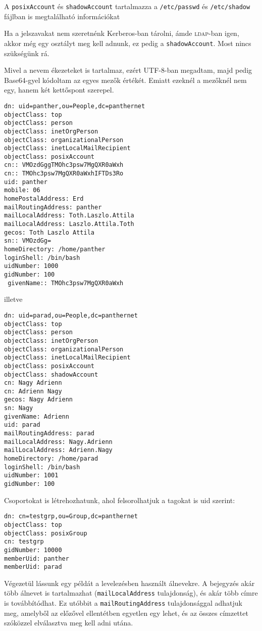 A \texttt{posixAccount} és \texttt{shadowAccount} tartalmazza a \texttt{/etc/passwd} és \texttt{/etc/shadow} fájlban
is megtalálható információkat

Ha a jelszavakat nem szeretnénk Kerberos-ban tárolni, ámde \textsc{ldap}-ban igen, akkor még egy osztályt meg kell adnunk, ez
pedig a \texttt{shadowAccount}. Most nincs szükségünk rá.

Mivel a nevem ékezeteket is tartalmaz, ezért UTF-8-ban megadtam, majd pedig Base64-gyel kódoltam az egyes mezők
értékét. Emiatt ezeknél a mezőknél nem egy, hanem két kettőspont szerepel.

\begin{Verbatim}[frame=single]
dn: uid=panther,ou=People,dc=panthernet
objectClass: top
objectClass: person
objectClass: inetOrgPerson
objectClass: organizationalPerson
objectClass: inetLocalMailRecipient
objectClass: posixAccount
cn:: VMOzdGggTMOhc3psw7MgQXR0aWxh
cn:: TMOhc3psw7MgQXR0aWxhIFTDs3Ro
uid: panther
mobile: 06
homePostalAddress: Erd
mailRoutingAddress: panther
mailLocalAddress: Toth.Laszlo.Attila
mailLocalAddress: Laszlo.Attila.Toth
gecos: Toth Laszlo Attila
sn:: VMOzdGg=
homeDirectory: /home/panther
loginShell: /bin/bash
uidNumber: 1000
gidNumber: 100
 givenName:: TMOhc3psw7MgQXR0aWxh
\end{Verbatim}

\noindent illetve

\begin{Verbatim}[frame=single]
dn: uid=parad,ou=People,dc=panthernet
objectClass: top
objectClass: person
objectClass: inetOrgPerson
objectClass: organizationalPerson
objectClass: inetLocalMailRecipient
objectClass: posixAccount
objectClass: shadowAccount
cn: Nagy Adrienn
cn: Adrienn Nagy
gecos: Nagy Adrienn
sn: Nagy
givenName: Adrienn
uid: parad
mailRoutingAddress: parad
mailLocalAddress: Nagy.Adrienn
mailLocalAddress: Adrienn.Nagy
homeDirectory: /home/parad
loginShell: /bin/bash
uidNumber: 1001
gidNumber: 100
\end{Verbatim}

\noindent Csoportokat is létrehozhatunk, ahol felsorolhatjuk a tagokat is uid szerint:

\begin{Verbatim}[frame=single]
dn: cn=testgrp,ou=Group,dc=panthernet
objectClass: top
objectClass: posixGroup
cn: testgrp
gidNumber: 10000
memberUid: panther
memberUid: parad
\end{Verbatim}


Végezetül lássunk egy példát a levelezésben használt álnevekre. A bejegyzés akár több álnevet is tartalmazhat
(\texttt{mailLocalAddress} tulajdonság), és akár több címre is továbbítódhat. Ez utóbbit a \texttt{mailRoutingAddress}
tulajdonsággal adhatjuk meg, amelyből az előzővel ellentétben egyetlen egy lehet, és az összes címzettet szóközzel
elválasztva meg kell adni utána.

